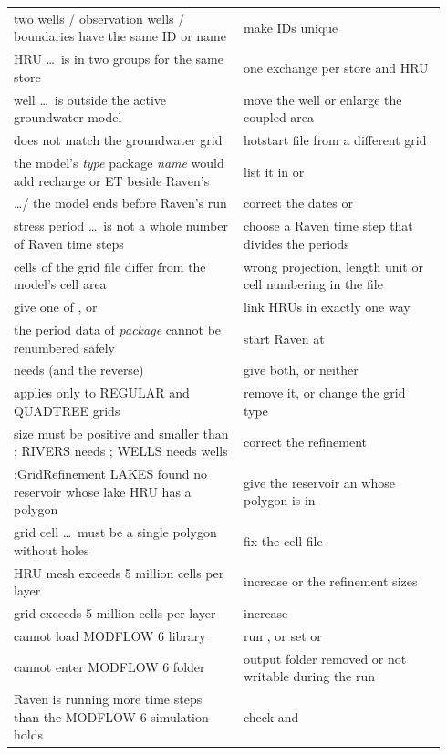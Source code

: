 \begin{longtable}{P{0.5\linewidth}P{0.44\linewidth}}
two wells / observation wells / boundaries have the same ID or name & make IDs unique\\
HRU \dots\ is in two  groups for the same store & one exchange per store and HRU\\
well \dots\ is outside the active groundwater model & move the well or enlarge the coupled area\\
 does not match the groundwater grid & hotstart file from a different grid\\
the model's \emph{type} package \emph{name} would add recharge or ET beside Raven's & list it in  or \\
 \dots / the model ends before Raven's run & correct the dates or \\
stress period \dots\ is not a whole number of Raven time steps & choose a Raven time step that divides the periods\\
cells of the grid file differ from the model's cell area & wrong projection, length unit or cell numbering in the file\\
give one of ,  or  & link HRUs in exactly one way\\
the period data of \emph{package} cannot be renumbered safely & start Raven at \\
 needs  (and the reverse) & give both, or neither\\
 applies only to REGULAR and QUADTREE grids & remove it, or change the grid type\\
 size must be positive and smaller than ; RIVERS needs ; WELLS needs wells & correct the refinement\\
:GridRefinement LAKES found no reservoir whose lake HRU has a polygon & give the reservoir an  whose polygon is in \\
grid cell \dots\ must be a single polygon without holes & fix the cell file\\
HRU mesh exceeds 5 million cells per layer & increase  or the refinement sizes\\
grid exceeds 5 million cells per layer & increase \\
cannot load MODFLOW 6 library & run , or set  or \\
cannot enter MODFLOW 6 folder & output folder removed or not writable during the run\\
Raven is running more time steps than the MODFLOW 6 simulation holds & check  and \\\bottomrule
\end{longtable}


